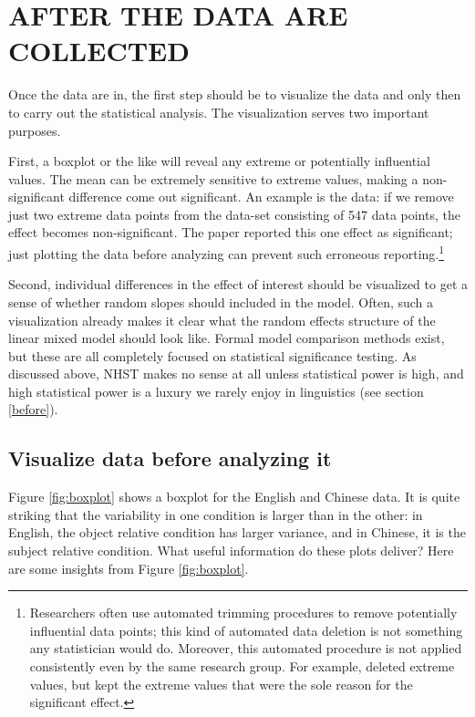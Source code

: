 \documentclass{ar-1col}\usepackage[]{graphicx}\usepackage[]{color}
\begin{document}
\section{AFTER THE DATA ARE COLLECTED}

Once the data are in, the first step should be to visualize the data and only then to carry out the statistical analysis. The visualization serves two important purposes. 

First, a boxplot or the like will reveal any extreme or potentially influential values. The mean can be extremely sensitive to extreme values, making a non-significant difference come out significant. An example is the \citet{gibsonwu} data: if we remove just two extreme data points from the data-set consisting of 547 data points, the effect becomes non-significant. The \citet{gibsonwu} paper reported this one effect as significant; just plotting the data before analyzing can prevent such erroneous reporting.\footnote{Researchers often use automated trimming procedures to remove potentially influential data points; this kind of automated data deletion is not something any statistician would do. Moreover, this automated procedure is not applied consistently even by the same research group. For example, \citet{grodner} deleted extreme values, but \citet{gibsonwu} kept the extreme values that were the sole reason for the significant effect.} 

Second, individual differences in the effect of interest should be visualized to get a sense of whether random slopes should included in the model. Often, such a visualization already makes it clear what the random effects structure of the linear mixed model should look like. Formal model comparison methods exist, but these are all completely focused on statistical significance testing. As discussed above, NHST makes no sense at all unless statistical power is high, and high statistical power is a luxury we rarely enjoy in linguistics (see section \ref{before}).  

\subsection{Visualize data before analyzing it}

Figure \ref{fig:boxplot} shows a boxplot for the English and Chinese data. It is quite striking that the variability in one condition is larger than in the other: in English, the object relative condition has larger variance, and in Chinese, it is the subject relative condition. What useful information do these plots deliver? Here are some insights from Figure \ref{fig:boxplot}.
\end{document}
